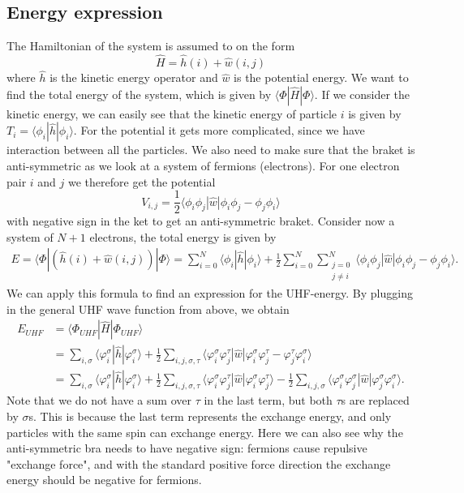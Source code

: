 \documentclass[norsk,a4paper,12pt]{article}
\begin{document}
\subsection{Energy expression}
The Hamiltonian of the system is assumed to on the form
\begin{equation}
\hat{H}=\hat{h}(i) + \hat{w}(i,j)
\end{equation}
where $\hat{h}$ is the kinetic energy operator and $\hat{w}$ is the potential energy. We want to find the total energy of the system, which is given by $\langle \Phi|\hat{H}|\Phi\rangle$. If we consider the kinetic energy, we can easily see that the kinetic energy of particle $i$ is given by $T_i=\langle\phi_i|\hat{h}|\phi_i\rangle$. For the potential it gets more complicated, since we have interaction between all the particles. We also need to make sure that the braket is anti-symmetric as we look at a system of fermions (electrons). For one electron pair $i$ and $j$ we therefore get the potential 
\begin{equation*}
V_{i,j}=\frac{1}{2}\langle\phi_i\phi_j|\hat{w}|\phi_i\phi_j-\phi_j\phi_i\rangle
\end{equation*}
with negative sign in the ket to get an anti-symmetric braket. Consider now a system of $N+1$ electrons, the total energy is given by
\begin{equation*}
\begin{split}
E=\langle\Phi|(\hat{h}(i) + \hat{w}(i,j))|\Phi\rangle
=\sum_{i=0}^N\langle\phi_i|\hat{h}|\phi_i\rangle+\frac{1}{2}\sum_{i=0}^N\sum_{\substack{j=0\\j\neq i}}^N\langle\phi_i\phi_j|\hat{w}|\phi_i\phi_j-\phi_j\phi_i\rangle.
\end{split}
\end{equation*}
We can apply this formula to find an expression for the UHF-energy. By plugging in the general UHF wave function from above, we obtain
\begin{align}
E_{UHF}&=\langle \Phi_{UHF}|\hat{H}|\Phi_{UHF}\rangle\\
&=\sum_{i,\sigma}\langle\varphi_i^{\sigma}|\hat{h}|\varphi_i^{\sigma}\rangle+\frac{1}{2}\sum_{i,j,\sigma,\tau}\langle\varphi_i^{\sigma}\varphi_j^{\tau}|\hat{w}|\varphi_i^{\sigma}\varphi_j^{\tau}-\varphi_j^{\tau}\varphi_i^{\sigma}\rangle\\
&=\sum_{i,\sigma}\langle\varphi_i^{\sigma}|\hat{h}|\varphi_i^{\sigma}\rangle+\frac{1}{2}\sum_{i,j,\sigma,\tau}\langle\varphi_i^{\sigma}\varphi_j^{\tau}|\hat{w}|\varphi_i^{\sigma}\varphi_j^{\tau}\rangle-\frac{1}{2}\sum_{i,j,\sigma}\langle\varphi_i^{\sigma}\varphi_j^{\sigma}|\hat{w}|\varphi_j^{\sigma}\varphi_i^{\sigma}\rangle.
\end{align}
Note that we do not have a sum over $\tau$ in the last term, but both $\tau$s are replaced by $\sigma$s. This is because the last term represents the exchange energy, and only particles with the same spin can exchange energy. Here we can also see why the anti-symmetric bra needs to have negative sign: fermions cause repulsive "exchange force", and with the standard positive force direction the exchange energy should be negative for fermions. 
\end{document}
